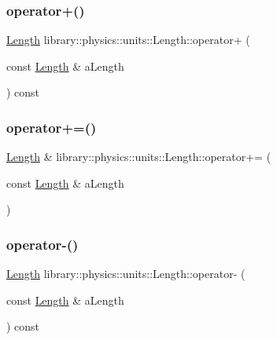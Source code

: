 \mbox{\label{classlibrary_1_1physics_1_1units_1_1_length_a511e4f9965dc83b505e4339479cd0d4b}} 
\subsubsection{\texorpdfstring{operator+()}{operator+()}}
{\footnotesize\ttfamily \hyperlink{classlibrary_1_1physics_1_1units_1_1_length}{Length} library\+::physics\+::units\+::\+Length\+::operator+ (\begin{DoxyParamCaption}\item[{const \hyperlink{classlibrary_1_1physics_1_1units_1_1_length}{Length} \&}]{a\+Length }\end{DoxyParamCaption}) const}

\mbox{\label{classlibrary_1_1physics_1_1units_1_1_length_ac3a51c8bd2a7c6f9ef39a3444d0bc3dc}} 
\subsubsection{\texorpdfstring{operator+=()}{operator+=()}}
{\footnotesize\ttfamily \hyperlink{classlibrary_1_1physics_1_1units_1_1_length}{Length} \& library\+::physics\+::units\+::\+Length\+::operator+= (\begin{DoxyParamCaption}\item[{const \hyperlink{classlibrary_1_1physics_1_1units_1_1_length}{Length} \&}]{a\+Length }\end{DoxyParamCaption})}

\mbox{\label{classlibrary_1_1physics_1_1units_1_1_length_af34113f000f221058dc48df951c0c861}} 
\subsubsection{\texorpdfstring{operator-\/()}{operator-()}}
{\footnotesize\ttfamily \hyperlink{classlibrary_1_1physics_1_1units_1_1_length}{Length} library\+::physics\+::units\+::\+Length\+::operator-\/ (\begin{DoxyParamCaption}\item[{const \hyperlink{classlibrary_1_1physics_1_1units_1_1_length}{Length} \&}]{a\+Length }\end{DoxyParamCaption}) const}

